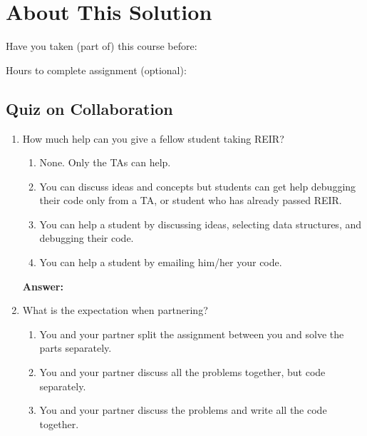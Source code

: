 \documentclass[11pt,a4paper,notitlepage]{article}
\newcommand{\explanation}[1]{}  %
\begin{document}
\explanation{Summarize briefly the outcomes. 
What do they mean? How successful was the experiment? 
Qualify your statements.}

\section{About This Solution}

Have you taken (part of) this course before:

Hours to complete assignment (optional):


\subsection{Quiz on Collaboration}

\begin{enumerate}
\item How much help can you give a fellow student taking REIR?
\begin{enumerate}
\item None. Only the TAs can help.
\item You can discuss ideas and concepts but students can get help
    debugging their code only from a TA, or
    student who has already passed REIR.
\item You can help a student by discussing ideas, selecting data
    structures, and debugging their code.
\item You can help a student by emailing him/her your code.
\end{enumerate}

\textbf{Answer:} 

\item What is the expectation when partnering?
\begin{enumerate}
 \item You and your partner split the assignment between you and solve the parts separately.
 \item You and your partner discuss all the problems together, but code separately.
 \item You and your partner discuss the problems and write all the code together.
\end{enumerate}
\end{enumerate}
\end{document}

